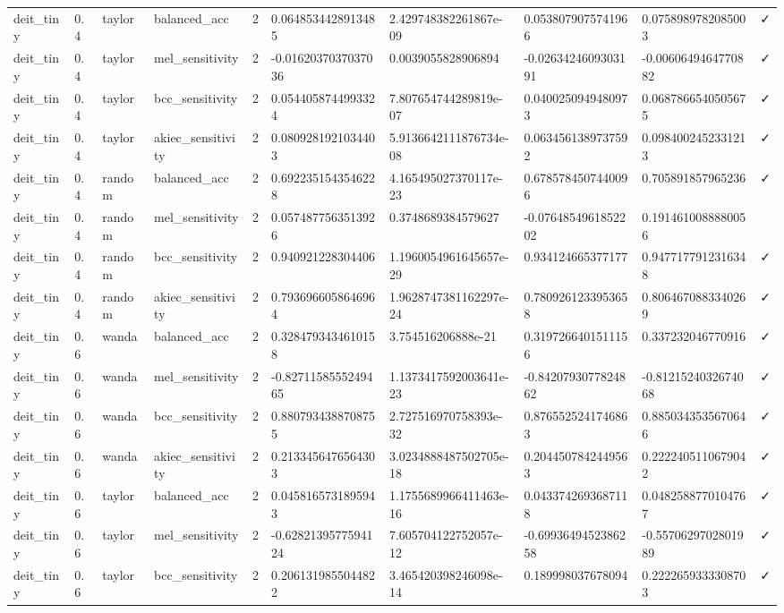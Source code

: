 \begin{table}[t]
\begin{tabular}{llllllllll}
deit\_tiny & 0.4 & taylor & balanced\_acc & 2 & 0.0648534428913485 & 2.429748382261867e-09 & 0.0538079075741966 & 0.0758989782085003 & ✓ \\
deit\_tiny & 0.4 & taylor & mel\_sensitivity & 2 & -0.0162037037037036 & 0.0039055828906894 & -0.0263424609303191 & -0.0060649464770882 & ✓ \\
deit\_tiny & 0.4 & taylor & bcc\_sensitivity & 2 & 0.0544058744993324 & 7.807654744289819e-07 & 0.0400250949480973 & 0.0687866540505675 & ✓ \\
deit\_tiny & 0.4 & taylor & akiec\_sensitivity & 2 & 0.0809281921034403 & 5.9136642111876734e-08 & 0.0634561389737592 & 0.0984002452331213 & ✓ \\
deit\_tiny & 0.4 & random & balanced\_acc & 2 & 0.6922351543546228 & 4.165495027370117e-23 & 0.6785784507440096 & 0.705891857965236 & ✓ \\
deit\_tiny & 0.4 & random & mel\_sensitivity & 2 & 0.0574877563513926 & 0.3748689384579627 & -0.0764854961852202 & 0.1914610088880056 &   \\
deit\_tiny & 0.4 & random & bcc\_sensitivity & 2 & 0.940921228304406 & 1.1960054961645657e-29 & 0.934124665377177 & 0.9477177912316348 & ✓ \\
deit\_tiny & 0.4 & random & akiec\_sensitivity & 2 & 0.7936966058646964 & 1.9628747381162297e-24 & 0.7809261233953658 & 0.8064670883340269 & ✓ \\
deit\_tiny & 0.6 & wanda & balanced\_acc & 2 & 0.3284793434610158 & 3.754516206888e-21 & 0.3197266401511156 & 0.337232046770916 & ✓ \\
deit\_tiny & 0.6 & wanda & mel\_sensitivity & 2 & -0.8271158555249465 & 1.1373417592003641e-23 & -0.8420793077824862 & -0.8121524032674068 & ✓ \\
deit\_tiny & 0.6 & wanda & bcc\_sensitivity & 2 & 0.8807934388708755 & 2.727516970758393e-32 & 0.8765525241746863 & 0.8850343535670646 & ✓ \\
deit\_tiny & 0.6 & wanda & akiec\_sensitivity & 2 & 0.2133456476564303 & 3.0234888487502705e-18 & 0.2044507842449563 & 0.2222405110679042 & ✓ \\
deit\_tiny & 0.6 & taylor & balanced\_acc & 2 & 0.0458165731895943 & 1.1755689966411463e-16 & 0.0433742693687118 & 0.0482588770104767 & ✓ \\
deit\_tiny & 0.6 & taylor & mel\_sensitivity & 2 & -0.6282139577594124 & 7.605704122752057e-12 & -0.6993649452386258 & -0.5570629702801989 & ✓ \\
deit\_tiny & 0.6 & taylor & bcc\_sensitivity & 2 & 0.2061319855044822 & 3.465420398246098e-14 & 0.189998037678094 & 0.2222659333308703 & ✓ \\

\end{tabular}
\end{table}
